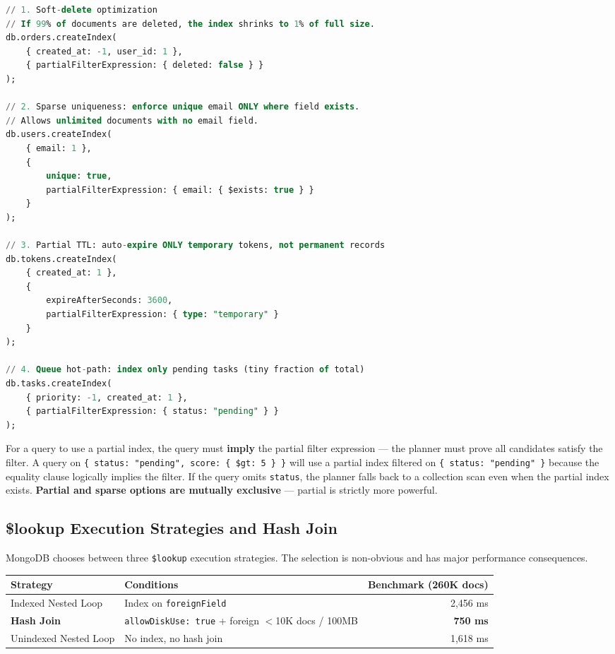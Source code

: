 \documentclass[12pt,a4paper]{article}
\begin{document}
\begin{lstlisting}[language=SQL, caption={Advanced partial index patterns}]
// 1. Soft-delete optimization
// If 99% of documents are deleted, the index shrinks to 1% of full size.
db.orders.createIndex(
    { created_at: -1, user_id: 1 },
    { partialFilterExpression: { deleted: false } }
);

// 2. Sparse uniqueness: enforce unique email ONLY where field exists.
// Allows unlimited documents with no email field.
db.users.createIndex(
    { email: 1 },
    {
        unique: true,
        partialFilterExpression: { email: { $exists: true } }
    }
);

// 3. Partial TTL: auto-expire ONLY temporary tokens, not permanent records
db.tokens.createIndex(
    { created_at: 1 },
    {
        expireAfterSeconds: 3600,
        partialFilterExpression: { type: "temporary" }
    }
);

// 4. Queue hot-path: index only pending tasks (tiny fraction of total)
db.tasks.createIndex(
    { priority: -1, created_at: 1 },
    { partialFilterExpression: { status: "pending" } }
);
\end{lstlisting}

\begin{infobox}
For a query to use a partial index, the query must \textbf{imply} the partial filter expression --- the planner must prove all candidates satisfy the filter. A query on \texttt{\{ status: "pending", score: \{ \$gt: 5 \} \}} will use a partial index filtered on \texttt{\{ status: "pending" \}} because the equality clause logically implies the filter. If the query omits \texttt{status}, the planner falls back to a collection scan even when the partial index exists. \textbf{Partial and sparse options are mutually exclusive} --- partial is strictly more powerful.
\end{infobox}

\subsection{\$lookup Execution Strategies and Hash Join}

MongoDB chooses between three \texttt{\$lookup} execution strategies. The selection is non-obvious and has major performance consequences.

\begin{center}
\begin{tabular}{lp{5cm}r}
\toprule
\textbf{Strategy} & \textbf{Conditions} & \textbf{Benchmark (260K docs)} \\
\midrule
Indexed Nested Loop & Index on \texttt{foreignField} & 2{,}456 ms \\
\textbf{Hash Join} & \texttt{allowDiskUse: true} + foreign $<$10K docs / 100MB & \textbf{750 ms} \\
Unindexed Nested Loop & No index, no hash join & 1{,}618 ms \\
\bottomrule
\end{tabular}
\end{center}
\end{document}
